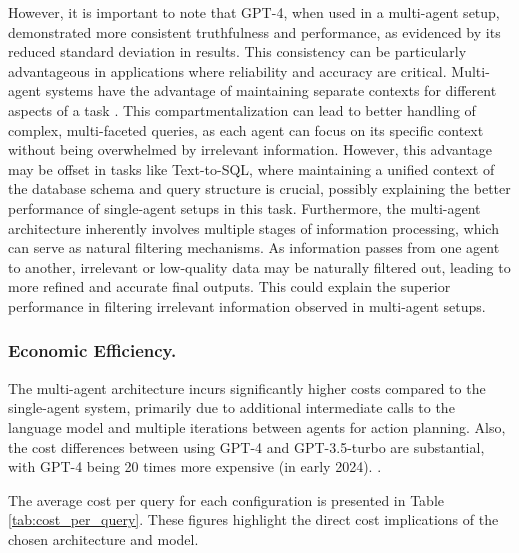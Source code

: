                However, it is important to note that GPT-4, when used in a multi-agent setup, demonstrated more consistent truthfulness and performance, as evidenced by its reduced standard deviation in results. 
                This consistency can be particularly advantageous in applications where reliability and accuracy are critical. 
                Multi-agent systems have the advantage of maintaining separate contexts for different aspects of a task \citep{Langchain2025blogmultiagent}. 
                This compartmentalization can lead to better handling of complex, multi-faceted queries, as each agent can focus on its specific context without being overwhelmed by irrelevant information. However, this advantage may be offset in tasks like Text-to-SQL, where maintaining a unified context of the database schema and query structure is crucial, possibly explaining the better performance of single-agent setups in this task.
                Furthermore, the multi-agent architecture inherently involves multiple stages of information processing, which can serve as natural filtering mechanisms.
                As information passes from one agent to another, irrelevant or low-quality data may be naturally filtered out, leading to more refined and accurate final outputs. 
                This could explain the superior performance in filtering irrelevant information observed in multi-agent setups.
            
            
            \subsubsection{Economic Efficiency.} 
            
                The multi-agent architecture incurs significantly higher costs compared to the single-agent system, primarily due to additional intermediate calls to the language model and multiple iterations between agents for action planning. 
                Also, the cost differences between using GPT-4 and GPT-3.5-turbo are substantial, with GPT-4 being 20 times more expensive (in early 2024).
                .

                The average cost per query for each configuration is presented in Table \ref{tab:cost_per_query}. These figures highlight the direct cost implications of the chosen architecture and model.
                
